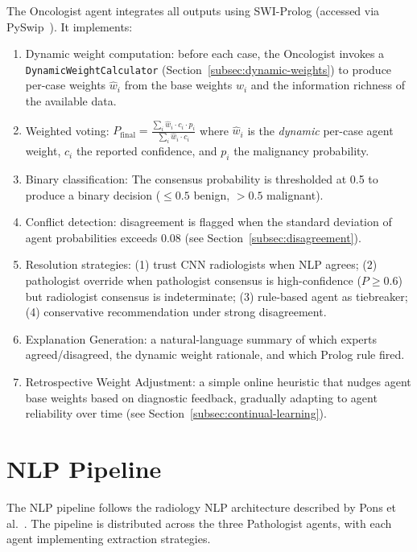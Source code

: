 \documentclass[12pt]{article}
\begin{document}
The Oncologist agent integrates all outputs using SWI-Prolog (accessed via PySwip~\cite{pyswip_repo}). It implements:
\begin{enumerate}
    \item Dynamic weight computation: before each case, the Oncologist invokes a \texttt{DynamicWeightCalculator} (Section~\ref{subsec:dynamic-weights}) to produce per-case weights $\hat{w}_i$ from the base weights $w_i$ and the information richness of the available data.
    \item Weighted voting: $P_\text{final} = \frac{\sum_{i} \hat{w}_i \cdot c_i \cdot p_i}{\sum_{i} \hat{w}_i \cdot c_i}$ where $\hat{w}_i$ is the \emph{dynamic} per-case agent weight, $c_i$ the reported confidence, and $p_i$ the malignancy probability.
    \item Binary classification: The consensus probability is thresholded at 0.5 to produce a binary decision ($\leq 0.5$ benign, $> 0.5$ malignant).
    \item Conflict detection: disagreement is flagged when the standard deviation of agent probabilities exceeds 0.08 (see Section~\ref{subsec:disagreement}).
    \item Resolution strategies: (1) trust CNN radiologists when NLP agrees; (2) pathologist override when pathologist consensus is high-confidence ($P \ge 0.6$) but radiologist consensus is indeterminate; (3) rule-based agent as tiebreaker; (4) conservative recommendation under strong disagreement.
    \item Explanation Generation: a natural-language summary of which experts agreed/disagreed, the dynamic weight rationale, and which Prolog rule fired.
    \item Retrospective Weight Adjustment: a simple online heuristic that nudges agent base weights based on diagnostic feedback, gradually adapting to agent reliability over time (see Section~\ref{subsec:continual-learning}).
\end{enumerate}


\section{NLP Pipeline}
\label{sec:nlp}

The NLP pipeline follows the radiology NLP architecture described by Pons et al.~\cite{pons2016nlpradiology}. The pipeline is distributed across the three Pathologist agents, with each agent implementing extraction strategies.
\end{document}
